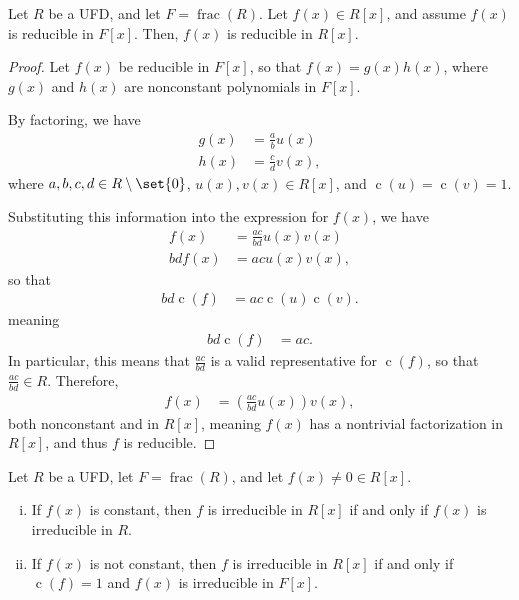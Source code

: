 \documentclass[10pt]{mypackage}
\begin{document}
\begin{corollary}
  Let $R$ be a UFD, and let $F = \operatorname{frac}\left( R \right)$. Let $f(x)\in R[x]$, and assume $f(x)$ is reducible in $F[x]$. Then, $f(x)$ is reducible in $R[x]$.
\end{corollary}
\begin{proof}
  Let $f(x)$ be reducible in $F[x]$, so that $f(x) = g(x)h(x)$, where $g(x)$ and $h(x)$ are nonconstant polynomials in $F[x]$.%

  By factoring, we have
  \begin{align*}
    g(x) &= \frac{a}{b}u(x)\\
    h(x) &= \frac{c}{d}v(x),
  \end{align*}
  where $a,b,c,d\in R\setminus \set{0}$, $u(x),v(x)\in R[x]$, and $ \operatorname{c}\left( u \right) = \operatorname{c}\left( v \right) = 1 $.%

  Substituting this information into the expression for $f(x)$, we have
  \begin{align*}
    f(x) &= \frac{ac}{bd}u(x)v(x)\\
    bd f(x) &= ac u(x)v(x),
  \end{align*}
  so that
  \begin{align*}
    bd \operatorname{c}\left( f \right)&= ac \operatorname{c}\left( u \right)\operatorname{c}\left( v \right).
  \end{align*}
  meaning
  \begin{align*}
    bd \operatorname{c}\left( f \right) &= ac.
  \end{align*}
  In particular, this means that $\frac{ac}{bd}$ is a valid representative for $\operatorname{c}\left( f \right)$, so that $ \frac{ac}{bd}\in R $. Therefore,
  \begin{align*}
    f(x) &= \left( \frac{ac}{bd}u(x) \right)v(x),
  \end{align*}
  both nonconstant and in $R[x]$, meaning $f(x)$ has a nontrivial factorization in $R[x]$, and thus $f$ is reducible.
\end{proof}
\begin{corollary}
  Let $R$ be a UFD, let $F = \operatorname{frac}\left( R \right)$, and let $f(x)\neq 0\in R[x]$.
  \begin{enumerate}[(i)]
    \item If $f(x)$ is constant, then $f$ is irreducible in $R[x]$ if and only if $f(x)$ is irreducible in $R$.
    \item If $f(x)$ is not constant, then $f$ is irreducible in $R[x]$ if and only if $\operatorname{c}\left( f \right) = 1$ and $f(x)$ is irreducible in $F[x]$.
  \end{enumerate}
\end{corollary}
\end{document}
